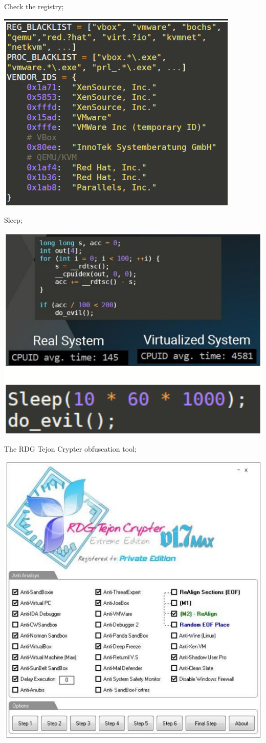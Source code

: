 \documentclass[]{project_plan}
\begin{document}
Check the registry;

\includegraphics[width=.7\linewidth]{regs.png}

Sleep;

\includegraphics[width=.7\linewidth]{sleep.png}

The RDG Tejon Crypter obfuscation tool;

\includegraphics[width=.7\linewidth]{obfs.png}
\end{document}
